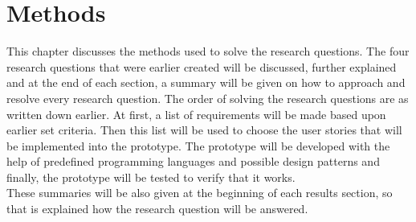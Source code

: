 \documentclass[paper=a4, fontsize=11pt,twoside]{scrartcl}	%
\begin{document}
\section{Methods}
This chapter discusses the methods used to solve the research questions. The four research questions that were earlier created will be discussed, further explained and at the end of each section, a summary will be given on how to approach and resolve every research question. The order of solving the research questions are as written down earlier. At first, a list of requirements will be made based upon earlier set criteria. Then this list will be used to choose the user stories that will be implemented into the prototype. The prototype will be developed  with the help of predefined programming languages and possible design patterns and finally, the prototype will be tested to verify that it works. \\
These summaries will be also given at the beginning of each results section, so that is explained how the research question will be answered.

\newpage
\end{document}
